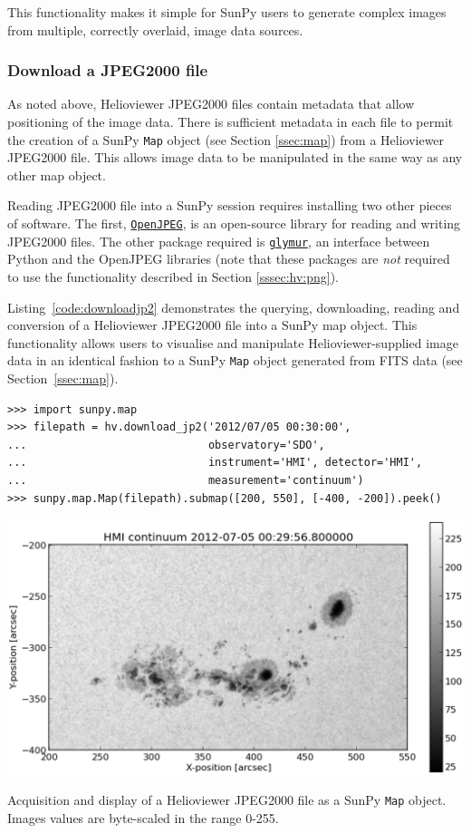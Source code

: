 This functionality makes it simple for SunPy users to generate complex
images from multiple, correctly overlaid, image data sources.

\subsubsection{Download a JPEG2000 file}\label{sssec:hv:jp}

As noted above, Helioviewer JPEG2000 files contain metadata that allow
positioning of the image data.  There is sufficient metadata in each
file to permit the creation of a SunPy \texttt{Map} object (see Section
\ref{ssec:map}) from a Helioviewer JPEG2000 file.  This allows image
data to be manipulated in the same way as any other map object.

Reading JPEG2000 file into a SunPy session requires installing two
other pieces of software. The first, 
\href{http://www.openjpeg.org}{\texttt{OpenJPEG}}, is an open-source
library for reading and writing JPEG2000 files.  The other package 
required is 
\href{https://github.com/quintusdias/glymur}{\texttt{glymur}}, an
interface between Python and the OpenJPEG libraries (note that these
packages are {\it not} required to use the functionality described in
Section \ref{sssec:hv:png}).

Listing~\ref{code:downloadjp2} demonstrates the querying, downloading,
reading and conversion of a Helioviewer JPEG2000 file into a SunPy map
object.  This functionality allows users to visualise and manipulate
Helioviewer-supplied image data in an identical fashion to a SunPy \texttt{Map}
object generated from FITS data (see Section~\ref{ssec:map}).

\begin{listing}[H]
\begin{verbatim}
>>> import sunpy.map
>>> filepath = hv.download_jp2('2012/07/05 00:30:00',
...                            observatory='SDO',
...                            instrument='HMI', detector='HMI', 
...                            measurement='continuum')
>>> sunpy.map.Map(filepath).submap([200, 550], [-400, -200]).peek()
\end{verbatim}
\begin{center}
\includegraphics[width=0.8\columnwidth]{helioviewer_hmi_continuum_jp2_to_map}
\end{center}
\caption{Acquisition and display of a Helioviewer JPEG2000 file as a
  SunPy \texttt{Map} object. Images values are byte-scaled in the range 0-255.}
\label{code:downloadjp2}
\end{listing}
